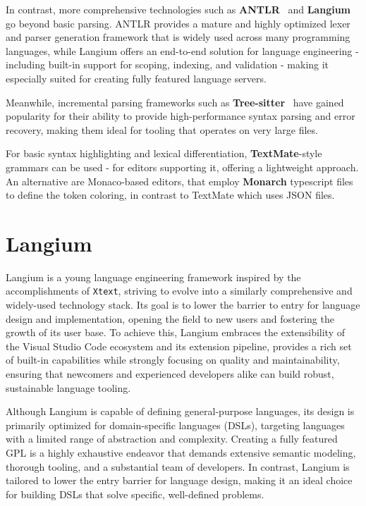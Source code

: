 In contrast, more comprehensive technologies such as \textbf{ANTLR}~\cite{ANTLR} and \textbf{Langium} go beyond
basic parsing. ANTLR provides a mature and highly optimized lexer and parser generation framework that is widely used across many programming languages, while Langium offers
an end-to-end solution for language engineering - including built-in support for scoping, indexing, and validation - making it especially suited for creating fully
featured language servers.

Meanwhile, incremental parsing frameworks such as \textbf{Tree-sitter}~\cite{Treesitter} have gained popularity for their ability to provide high-performance syntax parsing and error recovery,
making them ideal for tooling that operates on very large files.

For basic syntax highlighting and lexical differentiation, \textbf{TextMate}-style grammars \cite{TextMate} can be used - for editors supporting it, offering a lightweight approach.
An alternative are Monaco-based editors, that employ \textbf{Monarch} typescript files to define the token coloring, in contrast to TextMate which uses JSON files.

\chapter{Langium}

Langium is a young language engineering framework inspired by the accomplishments of \verb|Xtext|, striving to evolve into a similarly comprehensive and widely-used technology stack.\cite{LangiumWeb}
Its goal is to lower the barrier to entry for language design and implementation, opening the field to new users and fostering the growth of its user base.
To achieve this, Langium embraces the extensibility of the Visual Studio Code ecosystem and its extension pipeline, provides a rich set of built-in
capabilities while strongly focusing on quality and maintainability, ensuring that newcomers and experienced developers alike can build robust, sustainable language tooling.

Although Langium is capable of defining general-purpose languages, its design is primarily optimized for domain-specific languages (DSLs), targeting languages with a limited range of abstraction and complexity.
Creating a fully featured GPL is a highly exhaustive endeavor that demands extensive semantic modeling, thorough tooling, and a substantial team of developers.
In contrast, Langium is tailored to lower the entry barrier for language design, making it an ideal choice for building DSLs that solve specific, well-defined problems.
\\

